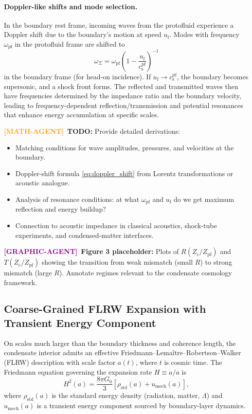 \documentclass[11pt,a4paper]{article}
\newcommand{\cs}{c_{\mathrm{s}}}
\newcommand{\umech}{u_{\mathrm{mech}}}
\newcommand{\rhostd}{\rho_{\mathrm{std}}}
\newcommand{\Zpf}{Z_{\mathrm{pf}}}
\newcommand{\Zcond}{Z_{\mathrm{c}}}
\newcommand{\uf}{u_{\mathrm{f}}}
\theoremstyle{definition}
\newcommand{\MATHAGENT}{\textcolor{orange}{\textbf{[MATH-AGENT]}}}
\newcommand{\GRAPHAGENT}{\textcolor{purple}{\textbf{[GRAPHIC-AGENT]}}}
\begin{document}
\paragraph{Doppler-like shifts and mode selection.}
In the boundary rest frame, incoming waves from the protofluid experience a Doppler shift due to the boundary's motion at speed $\uf$. Modes with frequency $\omega_{\mathrm{pf}}$ in the protofluid frame are shifted to
\begin{equation}
\label{eq:doppler_shift}
\omega_{\Sigma} = \omega_{\mathrm{pf}} \left(1 - \frac{\uf}{\cs^{\mathrm{pf}}} \right)^{-1}
\end{equation}
in the boundary frame (for head-on incidence). If $\uf \to \cs^{\mathrm{pf}}$, the boundary becomes supersonic, and a shock front forms. The reflected and transmitted waves then have frequencies determined by the impedance ratio and the boundary velocity, leading to frequency-dependent reflection/transmission and potential resonances that enhance energy accumulation at specific scales.

\MATHAGENT~\textbf{TODO:} Provide detailed derivations:
\begin{itemize}
  \item Matching conditions for wave amplitudes, pressures, and velocities at the boundary.
  \item Doppler-shift formula \eqref{eq:doppler_shift} from Lorentz transformations or acoustic analogue.
  \item Analysis of resonance conditions: at what $\omega_{\mathrm{pf}}$ and $\uf$ do we get maximum reflection and energy buildup?
  \item Connection to acoustic impedance in classical acoustics, shock-tube experiments, and condensed-matter interfaces.
\end{itemize}

\GRAPHAGENT~\textbf{Figure 3 placeholder:} Plots of $R(\Zcond/\Zpf)$ and $T(\Zcond/\Zpf)$ showing the transition from weak mismatch (small $R$) to strong mismatch (large $R$). Annotate regimes relevant to the condensate cosmology framework.

\subsection{Coarse-Grained FLRW Expansion with Transient Energy Component}
\label{sec:FLRW_coarse}

On scales much larger than the boundary thickness and coherence length, the condensate interior admits an effective Friedmann--Lema\^itre--Robertson--Walker (FLRW) description with scale factor $a(t)$, where $t$ is cosmic time. The Friedmann equation governing the expansion rate $H \equiv \dot{a}/a$ is
\begin{equation}
\label{eq:Friedmann_general}
H^2(a) = \frac{8\pi G_0}{3} \left[ \rhostd(a) + \umech(a) \right],
\end{equation}
where $\rhostd(a)$ is the standard energy density (radiation, matter, $\Lambda$) and $\umech(a)$ is a transient energy component sourced by boundary-layer dynamics.
\end{document}
